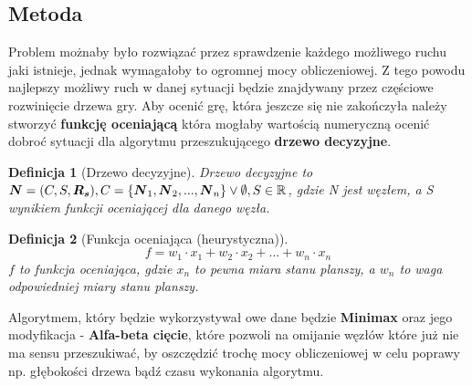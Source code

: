 \documentclass[12pt, a4paper]{article}
\newtheorem{definition}{Definicja}
\begin{document}
\subsection{Metoda}

Problem możnaby było rozwiązać przez sprawdzenie każdego możliwego ruchu jaki istnieje, 
jednak wymagałoby to ogromnej mocy obliczeniowej. Z tego powodu najlepszy możliwy ruch w danej sytuacji 
będzie znajdywany przez częściowe rozwinięcie drzewa gry. Aby ocenić grę, która jeszcze się nie zakończyła
należy stworzyć \textbf{funkcję oceniającą} która mogłaby wartością numeryczną ocenić dobroć sytuacji dla algorytmu
przeszukującego \textbf{drzewo decyzyjne}.

\begin{definition}[Drzewo decyzyjne]
    Drzewo decyzyjne to $\boldsymbol{N} = (C, S, \boldsymbol{R_s}), \\
    C = \{\boldsymbol{N}_1, \boldsymbol{N}_2, ...,  \boldsymbol{N}_n\} \lor \emptyset,
    S \in \mathbb{R} $, gdzie N jest węzłem, a S wynikiem funkcji oceniającej dla danego węzła.
\end{definition}

\begin{definition}[Funkcja oceniająca (heurystyczna)]
    $$f = w_1 \cdot x_1 + w_2 \cdot x_2 + ... + w_n \cdot x_n$$
    $f$ to funkcja oceniająca, gdzie $x_n$ to pewna miara stanu planszy,
    a $w_n$ to waga odpowiedniej miary stanu planszy.
\end{definition}

Algorytmem, który będzie wykorzystywał owe dane będzie \textbf{Minimax} oraz jego modyfikacja -
\textbf{Alfa-beta cięcie}, które pozwoli na omijanie węzłów które już nie ma sensu przeszukiwać, by
oszczędzić trochę mocy obliczeniowej w celu poprawy np. głębokości drzewa bądź czasu wykonania algorytmu.
\end{document}
